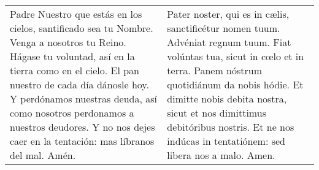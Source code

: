 \documentclass[../devocionario.tex]{subfiles}
\begin{document}
    \begin{longtable} { p{} p{} }
        Padre Nuestro que estás en los cielos, santificado sea tu Nombre. Venga a nosotros tu Reino. 
        Hágase tu voluntad, así en la tierra como en el cielo. El pan nuestro de cada día dánosle hoy. 
        Y perdónamos nuestras deuda, así como nosotros perdonamos a nuestros deudores. 
        Y no nos dejes caer en la tentación: mas líbranos del mal. Amén.
        
        &
        
        Pater noster, qui es in cælis, sanctificétur nomen tuum. Advéniat regnum tuum. 
        Fiat volúntas tua, sicut in cœlo et in terra. Panem nóstrum quotidiánum da nobis hódie. 
        Et dimitte nobis debita nostra, sicut et nos dimittimus debitóribus nostris. 
        Et ne nos indúcas in tentatiónem: sed libera nos a malo. Amen.
    \end{longtable}
\end{document}
